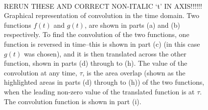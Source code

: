 \begin{figure}[p]
\begin{center}
{	\label{fig:conv_t3}
}
\\
\caption[Graphical representation of convolution in the time domain.]{RERUN THESE AND CORRECT NON-ITALIC `t' IN AXIS!!!!!! Graphical representation of convolution in the time domain. Two functions $f\left(t\right)$ and $g\left(t\right)$, are shown in parts (a) and (b) respectively. To find the convolution of the two functions, one function is reversed in time--this is shown in part (c) (in this case $g\left(t\right)$ was chosen), and it is then translated across the other function, shown in parts (d) through to (h). The value of the convolution at any time, $\tau$, is the area overlap (shown as the highlighted areas in parts (d) through to (h)) of the two functions, when the leading non-zero value of the translated function is at $\tau$. The convolution function is shown in part (i).}\label{fig:convolution_time}
\end{center}
\end{figure}

